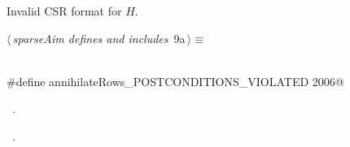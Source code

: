 \documentclass{article}
\begin{document}
\begin{description}
\begin{description}
\begin{flushleft}
\begin{minipage}{\linewidth}
\begin{list}{}{\setlength{\itemsep}{-\parsep}\setlength{\itemindent}{-\leftmargin}}
\item{}
\end{list}
\end{minipage}\vspace{4ex}
\end{flushleft}
\item[{\bf annihilateRows\_POSTCONDITIONS\_VIOLATED}] Invalid CSR format for $H$.
\begin{flushleft} \small
\begin{minipage}{\linewidth}\label{scrap9}\raggedright\small
{} $\langle\,${\itshape sparseAim defines and includes}\nobreak\ {\footnotesize {9a}}$\,\rangle\equiv$
\vspace{-1ex}
\begin{list}{}{} \item
\mbox{}\verb@@\\
\mbox{}\verb@#define annihilateRows_POSTCONDITIONS_VIOLATED 2006@\\
\mbox{}\verb@@{\NWsep}
\end{list}
\vspace{-1.5ex}
\footnotesize
\begin{list}{}{\setlength{\itemsep}{-\parsep}\setlength{\itemindent}{-\leftmargin}}
\item \NWtxtMacroDefBy\ .
\item \NWtxtMacroRefIn\ .


\end{list}
\end{minipage}
\end{flushleft}
\end{description}
\end{description}
\end{document}
